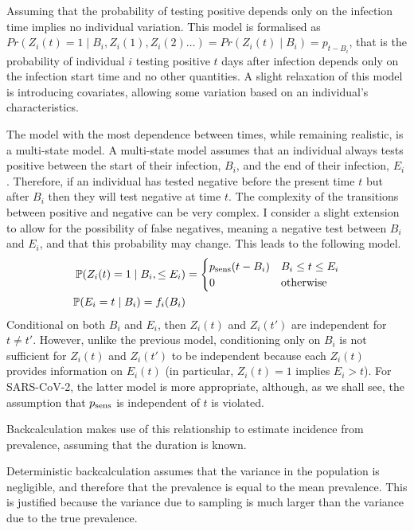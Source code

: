 \documentclass[thesis.tex]{subfiles}
\begin{document}
Assuming that the probability of testing positive depends only on the infection time implies no individual variation.
This model is formalised as $Pr(Z_i(t) = 1 \mid B_i, Z_i(1), Z_i(2) \dots) = Pr(Z_i(t) \mid B_i) = p_{t-B_i}$, that is the probability of individual $i$ testing positive $t$ days after infection depends only on the infection start time and no other quantities.
A slight relaxation of this model is introducing covariates, allowing some variation based on an individual's characteristics.

The model with the most dependence between times, while remaining realistic, is a multi-state model.
A multi-state model assumes that an individual always tests positive between the start of their infection, $B_i$, and the end of their infection, $E_i$.
Therefore, if an individual has tested negative before the present time $t$ but after $B_i$ then they will test negative at time $t$.
The complexity of the transitions between positive and negative can be very complex.
I consider a slight extension to allow for the possibility of false negatives, meaning a negative test between $B_i$ and $E_i$, and that this probability may change.
This leads to the following model.
\begin{align}
  \operatorname{\mathbb{P}}(Z_i(t) = 1 \mid B_i, \leq E_i) &= \begin{cases}
    p_\text{sens}(t - B_i) &B_i \leq t \leq E_i\\
    0 &\text{otherwise}
  \end{cases}\\
  \operatorname{\mathbb{P}}(E_i = t \mid B_i) = f_i(B_i)
\end{align}
Conditional on both $B_i$ and $E_i$, then $Z_i(t)$ and $Z_i(t')$ are independent for $t \neq t'$.
However, unlike the previous model, conditioning only on $B_i$ is not sufficient for $Z_i(t)$ and $Z_i(t')$ to be independent because each $Z_i(t)$ provides information on $E_i(t)$ (in particular, $Z_i(t) = 1$ implies $E_i > t$).
For SARS-CoV-2, the latter model is more appropriate, although, as we shall see, the assumption that $p_\text{sens}$ is independent of $t$ is violated.

Backcalculation makes use of this relationship to estimate incidence from prevalence, assuming that the duration is known.

Deterministic backcalculation assumes that the variance in the population is negligible, and therefore that the prevalence is equal to the mean prevalence.
This is justified because the variance due to sampling is much larger than the variance due to the true prevalence.
\end{document}
